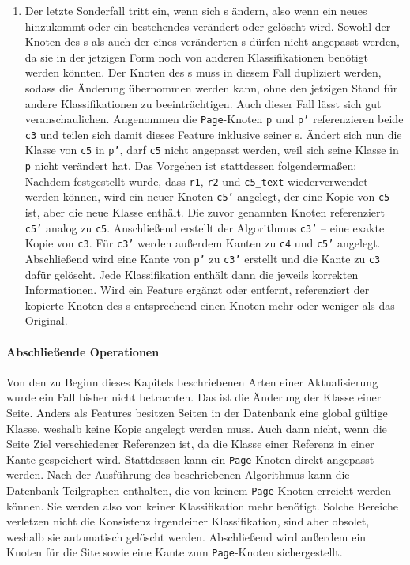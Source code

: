 \begin{enumerate}
        \item Der letzte Sonderfall tritt ein, wenn sich {\childFeature}s ändern,
        also wenn ein neues hinzukommt oder ein bestehendes verändert oder gelöscht wird.
        Sowohl der Knoten des {\parentFeature}s als auch der eines veränderten {\childFeature}s
        dürfen nicht angepasst werden, da sie in der jetzigen Form noch von anderen
        Klassifikationen benötigt werden könnten.
        Der Knoten des {\parentFeature}s muss in diesem Fall dupliziert werden,
        sodass die Änderung übernommen werden kann,
        ohne den jetzigen Stand für andere Klassifikationen zu beeinträchtigen.
        Auch dieser Fall lässt sich gut veranschaulichen.
        Angenommen die \texttt{Page}-Knoten \texttt{p} und \texttt{p'} referenzieren beide \texttt{c3} und teilen sich damit
        dieses Feature inklusive seiner {\childFeature}s.
        Ändert sich nun die Klasse von \texttt{c5} in \texttt{p'},
        darf \texttt{c5} nicht angepasst werden, weil sich seine Klasse in \texttt{p} nicht verändert hat.
        Das Vorgehen ist stattdessen folgendermaßen:
        Nachdem festgestellt wurde, dass \texttt{r1}, \texttt{r2} und \texttt{c5\_text} wiederverwendet werden können,
        wird ein neuer Knoten \texttt{c5'} angelegt, der eine Kopie von \texttt{c5} ist, aber die neue Klasse enthält.
        Die zuvor genannten Knoten referenziert \texttt{c5'} analog zu \texttt{c5}.
        Anschließend erstellt der Algorithmus \texttt{c3'} -- eine exakte Kopie von \texttt{c3}.
        Für \texttt{c3'} werden außerdem Kanten zu \texttt{c4} und \texttt{c5'} angelegt.
        Abschließend wird eine Kante von \texttt{p'} zu \texttt{c3'} erstellt und die Kante zu \texttt{c3} dafür gelöscht.
        Jede Klassifikation enthält dann die jeweils korrekten Informationen.
        Wird ein Feature ergänzt oder entfernt, referenziert der kopierte Knoten des {\parentFeature}s
        entsprechend einen Knoten mehr oder weniger als das Original.
    \end{enumerate}

    \paragraph{Abschließende Operationen}
    Von den zu Beginn dieses Kapitels beschriebenen Arten einer Aktualisierung wurde ein Fall bisher nicht betrachten.
    Das ist die Änderung der Klasse einer Seite.
    Anders als Features besitzen Seiten in der Datenbank eine global gültige Klasse,
    weshalb keine Kopie angelegt werden muss.
    Auch dann nicht, wenn die Seite Ziel verschiedener Referenzen ist,
    da die Klasse einer Referenz in einer Kante gespeichert wird.
    Stattdessen kann ein \texttt{Page}-Knoten direkt angepasst werden.
    Nach der Ausführung des beschriebenen Algorithmus kann die Datenbank
    Teilgraphen enthalten, die von keinem \texttt{Page}-Knoten erreicht werden können.
    Sie werden also von keiner Klassifikation mehr benötigt.
    Solche Bereiche verletzen nicht die Konsistenz irgendeiner Klassifikation,
    sind aber obsolet, weshalb sie automatisch gelöscht werden.
    Abschließend wird außerdem ein Knoten für die Site sowie eine Kante zum \texttt{Page}-Knoten sichergestellt.


